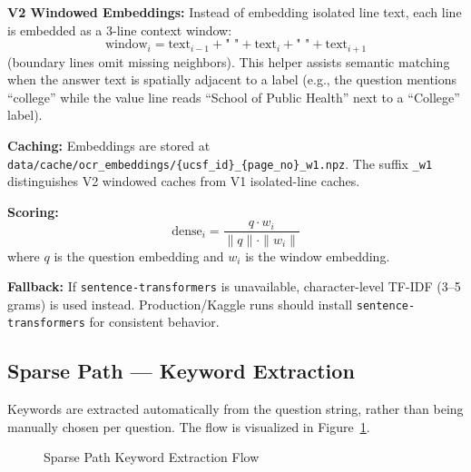 \documentclass[11pt,a4paper]{article}
\begin{document}
\noindent\textbf{V2 Windowed Embeddings:} Instead of embedding isolated line text, each line is embedded as a 3-line context window:
\begin{equation}
\text{window}_i = \text{text}_{i-1} + \text{" "} + \text{text}_i + \text{" "} + \text{text}_{i+1}
\end{equation}
(boundary lines omit missing neighbors). This helper assists semantic matching when the answer text is spatially adjacent to a label (e.g., the question mentions ``college'' while the value line reads ``School of Public Health'' next to a ``College'' label).

\noindent\textbf{Caching:} Embeddings are stored at \texttt{data/cache/ocr\_embeddings/\{ucsf\_id\}\_\{page\_no\}\_w1.npz}. The suffix \texttt{\_w1} distinguishes V2 windowed caches from V1 isolated-line caches.

\noindent\textbf{Scoring:}
\begin{equation}
\text{dense}_i = \frac{q \cdot w_i}{\|q\| \cdot \|w_i\|}
\end{equation}
where $q$ is the question embedding and $w_i$ is the window embedding.

\noindent\textbf{Fallback:} If \texttt{sentence-transformers} is unavailable, character-level TF-IDF (3--5 grams) is used instead. Production/Kaggle runs should install \texttt{sentence-transformers} for consistent behavior.

\subsection{Sparse Path --- Keyword Extraction}
Keywords are extracted automatically from the question string, rather than being manually chosen per question. The flow is visualized in Figure~\ref{fig:keyword_flow}.

\begin{figure}[H]
\centering
{}
\caption{Sparse Path Keyword Extraction Flow}
\label{fig:keyword_flow}
\end{figure}
\end{document}
